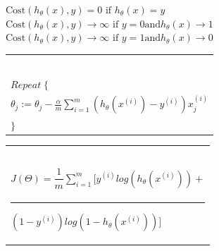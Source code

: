 \documentclass[a4paper,12pt,ngerman,fleqn]{article}
\newcommand{\mybox}[3]{
        \centering
        \begin{tabularx}{0.9\textwidth}{|X|}
            \rowcolor{accent}
            \rule{0pt}{20pt}
            \textcolor{white}{\textbf{#1}} \\
            \def\temp{#2}\ifx\temp\empty
                
            \else
                #2 \\ \hline
            \fi
            #3
            \\ \hline
        \end{tabularx}
    }
\begin{document}
\begin{minipage}[t]{.51\textwidth}
{                \(\mathrm{Cost}(h_\theta(x),y) = 0 \text{  if  } h_\theta(x) = y \) \\
                \(\mathrm{Cost}(h_\theta(x),y) \rightarrow \infty \text{  if  } y = 0 \mathrm{and} h_\theta(x) \rightarrow 1 \) \\
                \(\mathrm{Cost}(h_\theta(x),y) \rightarrow \infty \text{  if  } y = 1 \mathrm{and} h_\theta(x) \rightarrow 0 \)
            }
        \newline
    \end{minipage}%
    \begin{minipage}[t]{.51\textwidth}
        \vspace{1pt}
        \mybox
            {Gradient Descent}
            {}
            {
                \( Repeat \; \lbrace \) \\
                \( \theta_j := \theta_j - \frac{\alpha}{m} \sum_{i=1}^m (h_\theta(x^{(i)}) - y^{(i)}) x_j^{(i)} \) \\
                \(\rbrace\)
            }
        \newline
        \newline
        \newline
        \mybox
            {Simpliefied Cost Function}
            {}
            {
                \rule{0pt}{20pt}
                \( J(\Theta) = \dfrac{1}{m} \sum\limits_{i=1}^{m}[y^{(i)}log(h_\theta(x^{(i)})) + \) \\
                \rule{40pt}{0pt}
                \( (1 - y^{(i)})log(1 - h_\theta(x^{(i)}))] \)
            }
        \newline
    \end{minipage}

    \vspace{55pt}
    
\end{document}
